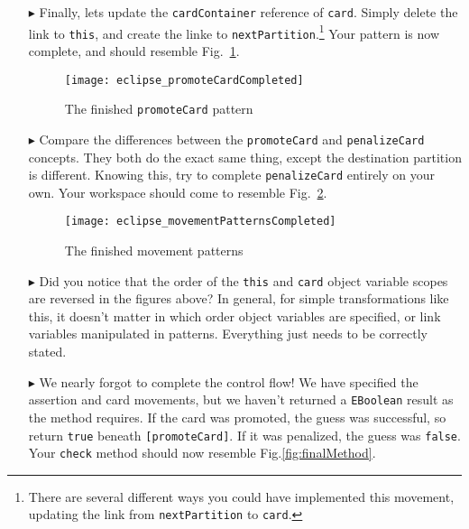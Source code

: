 \begin{itemize}
\item[$\blacktriangleright$] Finally, lets update the \texttt{cardContainer} reference of \texttt{card}. Simply delete the link to \texttt{this}, and create the
linke to \texttt{nextPartition}.\footnote{There are several different ways you could have implemented this movement, updating the link from
\texttt{nextPartition} to \texttt{card}.} Your pattern is now complete, and should resemble Fig.~\ref{fig:completedPromote}.

\begin{figure}[htbp]
\begin{center}
  \texttt{[image: eclipse\_promoteCardCompleted]}
  \caption{The finished \texttt{promoteCard} pattern}
  \label{fig:completedPromote}
\end{center}
\end{figure} 

\item[$\blacktriangleright$] Compare the differences between the \texttt{promoteCard} and \texttt{penalizeCard} concepts. They both do the exact same thing,
except the destination partition is different. Knowing this, try to complete \texttt{penalizeCard} entirely on your own. Your workspace should come to
resemble Fig.~\ref{fig:completedPatterns}.

\begin{figure}[htbp]
\begin{center}
  \texttt{[image: eclipse\_movementPatternsCompleted]}
  \caption{The finished movement patterns}
  \label{fig:completedPatterns}
\end{center}
\end{figure}


\item[$\blacktriangleright$] Did you notice that the order of the \texttt{this} and \texttt{card} object variable scopes are reversed in the figures above?
In general, for simple transformations like this, it doesn't matter in which order object variables are specified, or link variables manipulated in patterns.
Everything just needs to be correctly stated.

\item[$\blacktriangleright$] We nearly forgot to complete the control flow! We have specified the assertion and card movements, but we haven't returned a
\texttt{EBoolean} result as the method requires. If the card was promoted, the guess was successful, so return \texttt{true} beneath \texttt{[promoteCard]}. If
it was penalized, the guess was \texttt{false}. Your \texttt{check} method should now resemble Fig.\ref{fig:finalMethod}.


\end{itemize}
